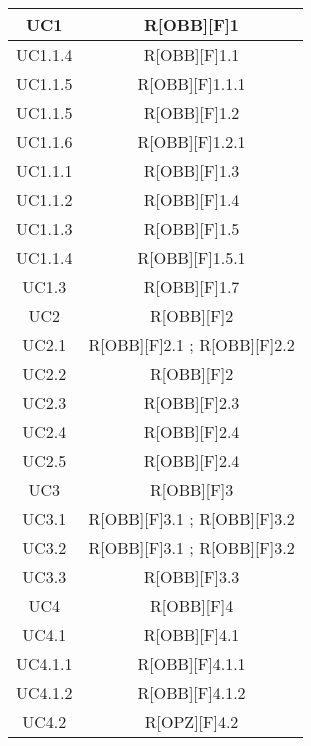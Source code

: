 	\begin{table}[h]
		\centering
		\begin{tabular}{|c|c|}
			\midrule
			
			UC1 & R[OBB][F]1 \\ \midrule
			UC1.1.4 & R[OBB][F]1.1 \\ \midrule
			UC1.1.5 & R[OBB][F]1.1.1 \\ \midrule
			UC1.1.5 & R[OBB][F]1.2 \\ \midrule
			UC1.1.6 & R[OBB][F]1.2.1 \\ \midrule
			UC1.1.1 & R[OBB][F]1.3 \\ \midrule
			UC1.1.2 & R[OBB][F]1.4 \\ \midrule
			UC1.1.3 & R[OBB][F]1.5 \\ \midrule
			UC1.1.4 & R[OBB][F]1.5.1 \\ \midrule
			UC1.3 & R[OBB][F]1.7 \\ \midrule
			UC2 & R[OBB][F]2 \\ \midrule
			UC2.1 & R[OBB][F]2.1 ; R[OBB][F]2.2 \\ \midrule
			UC2.2 & R[OBB][F]2 \\ \midrule
			UC2.3 & R[OBB][F]2.3 \\ \midrule
			UC2.4 & R[OBB][F]2.4 \\ \midrule
			UC2.5 & R[OBB][F]2.4 \\ \midrule
			UC3 & R[OBB][F]3 \\ \midrule
			UC3.1 & R[OBB][F]3.1 ; R[OBB][F]3.2 \\ \midrule
			UC3.2 & R[OBB][F]3.1 ; R[OBB][F]3.2 \\ \midrule
			UC3.3 & R[OBB][F]3.3 \\ \midrule
			UC4 & R[OBB][F]4 \\ \midrule
			UC4.1 & R[OBB][F]4.1 \\ \midrule
			UC4.1.1 & R[OBB][F]4.1.1 \\ \midrule
			UC4.1.2 & R[OBB][F]4.1.2 \\ \midrule
			UC4.2 & R[OPZ][F]4.2 \\ \midrule

		\end{tabular}
	\end{table}
	\newpage
	
